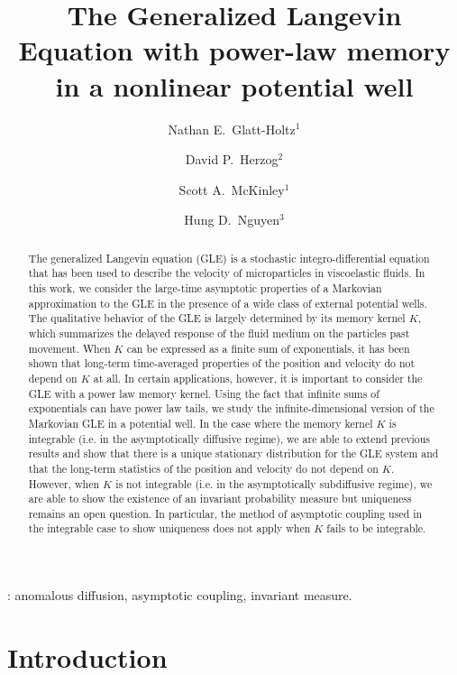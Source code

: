\documentclass[11pt]{amsart}
\title[Generalized Langevin Equation with Power-Law Memory]{The Generalized Langevin Equation with power-law memory in a nonlinear potential well}
\author[N.E.~Glatt-Holtz]{Nathan E.~Glatt-Holtz$^1$}
\author[D.P.~Herzog]{David P.~Herzog$^2$}
\author[S.A.~McKinley]{Scott A.~McKinley$^1$}
\author[H.D.~Nguyen]{Hung D.~Nguyen$^3$}
\theoremstyle{definition}
\theoremstyle{definition}
\theoremstyle{plain}
\numberwithin{equation}{section}
\begin{document}
\maketitle


\begin{abstract}
The generalized Langevin equation (GLE) is a stochastic integro-differential equation that has been used to describe the velocity of microparticles in viscoelastic fluids. In this work, we consider the large-time asymptotic properties of a Markovian approximation to the GLE in the presence of a wide class of external potential wells. The qualitative behavior of the GLE is largely determined by its memory kernel $K$, which summarizes the delayed response of the fluid medium on the particles past movement. When $K$ can be expressed as a finite sum of exponentials, it has been shown that long-term time-averaged properties of the position and velocity do not depend on $K$ at all. In certain applications, however, it is important to consider the GLE with a power law memory kernel. Using the fact that infinite sums of exponentials can have power law tails, we study the infinite-dimensional version of the Markovian GLE in a potential well. In the case where the memory kernel $K$ is integrable (i.e. in the asymptotically diffusive regime), we are able to extend previous results and show that there is a unique stationary distribution for the GLE system and that the long-term statistics of the position and velocity do not depend on $K$.  However, when $K$ is not integrable (i.e. in the asymptotically subdiffusive regime), we are able to show the existence of an invariant probability measure but uniqueness remains an open question. In particular, the method of asymptotic coupling used in the integrable case to show uniqueness does not apply when $K$ fails to be integrable. 
\end{abstract}

\vspace{0.5cm}

: anomalous diffusion, asymptotic coupling, invariant measure.



\section{Introduction}
\end{document}
